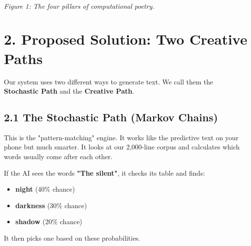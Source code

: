 \documentclass[12pt, a4paper]{article}
\begin{document}
\begin{center}
    \small \\ \textit{Figure 1: The four pillars of computational poetry.}
\end{center}

\newpage

\section{2. Proposed Solution: Two Creative Paths}
Our system uses two different ways to generate text. We call them the \textbf{Stochastic Path} and the \textbf{Creative Path}.

\subsection{2.1 The Stochastic Path (Markov Chains)}
This is the "pattern-matching" engine. It works like the predictive text on your phone but much smarter. It looks at our 2,000-line corpus and calculates which words usually come after each other.

\begin{tcolorbox}[title=How it predicts words]
If the AI sees the words \textbf{"The silent"}, it checks its table and finds:
\begin{itemize}
    \item \textbf{night} (40\% chance)
    \item \textbf{darkness} (30\% chance)
    \item \textbf{shadow} (20\% chance)
\end{itemize}
It then picks one based on these probabilities.
\end{tcolorbox}
\end{document}
